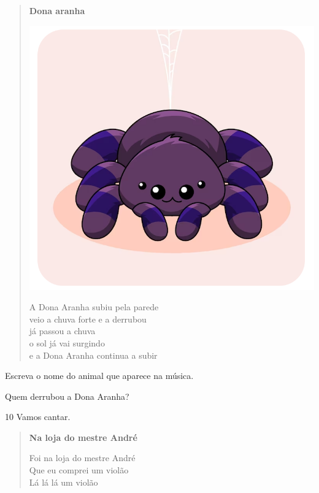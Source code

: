 \begin{myquote}
\begin{verse}
\begin{center}
\textbf{Dona aranha}

\noindent\includegraphics[width=.65\textwidth]{media/image185.png}
\end{center}
A Dona Aranha subiu pela parede\\
veio a chuva forte e a derrubou\\
já passou a chuva\\
o sol já vai surgindo\\
e a Dona Aranha continua a subir
\end{verse}

\end{myquote}

\begin{escolha}
\item Escreva o nome do animal que aparece na música.\\

\item Quem derrubou a Dona Aranha?\\

\end{escolha}

\num{10} Vamos cantar.

\begin{myquote}
\begin{verse}
\textbf{Na loja do mestre André}

Foi na loja do mestre André\\
Que eu comprei um violão\\
Lá lá lá um violão
\end{verse}
\end{myquote}

